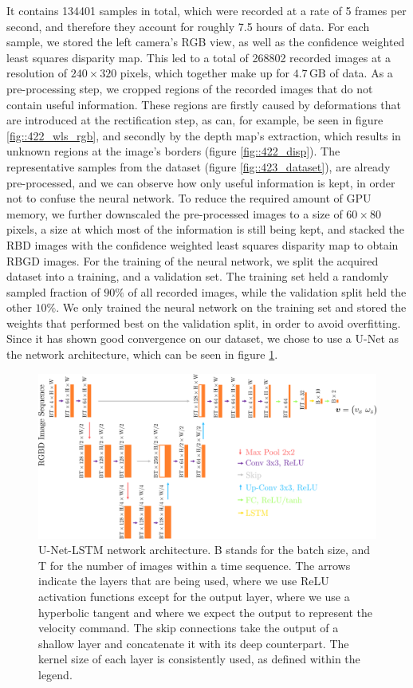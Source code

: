 It contains 134401 samples in total, which were recorded at a rate of 5 frames per second, and therefore they account for roughly 7.5 hours of data. For each sample, we stored the left camera's RGB view, as well as the confidence weighted least squares disparity map. This led to a total of 268802 recorded images at a resolution of $240\times320$ pixels, which together make up for $4.7\,\text{GB}$ of data. As a pre-processing step, we cropped regions of the recorded images that do not contain useful information. These regions are firstly caused by deformations that are introduced at the rectification step, as can, for example, be seen in figure \ref{fig::422_wls_rgb}, and secondly by the depth map's extraction, which results in unknown regions at the image's borders (figure \ref{fig::422_disp}). The representative samples from the dataset (figure \ref{fig::423_dataset}), are already pre-processed, and we can observe how only useful information is kept, in order not to confuse the neural network. To reduce the required amount of GPU memory, we further downscaled the pre-processed images to a size of $60\times80$ pixels, a size at which most of the information is still being kept, and stacked the RBD images with the confidence weighted least squares disparity map to obtain RBGD images. For the training of the neural network, we split the acquired dataset into a training, and a validation set. The training set held a randomly sampled fraction of $90\%$ of all recorded images, while the validation split held the other $10\%$. We only trained the neural network on the training set and stored the weights that performed best on the validation split, in order to avoid overfitting. Since it has shown good convergence on our dataset, we chose to use a U-Net \cite{ronneberger2015u} as the network architecture, which can be seen in figure \ref{fig::423_unet}.
\begin{figure}[h!]
	\centering
	\includegraphics[scale=.5]{chapters/04_experiments/02_autonomous_walking/unet.png}
	\caption{U-Net-LSTM network architecture. B stands for the batch size, and T for the number of images within a time sequence. The arrows indicate the layers that are being used, where we use ReLU activation functions except for the output layer, where we use a hyperbolic tangent and where we expect the output to represent the velocity command. The skip connections take the output of a shallow layer and concatenate it with its deep counterpart. The kernel size of each layer is consistently used, as defined within the legend.}
	\label{fig::423_unet}
\end{figure}
